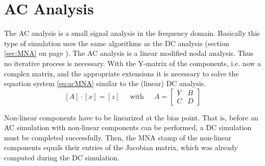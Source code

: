 %
%
%
%

\chapter{AC Analysis}
\label{sec:acMNA}

The AC analysis is a small signal analysis in the frequency domain.
Basically this type of simulation uses the same algorithms as the DC
analysis (section \ref{sec:MNA} on page \pageref{sec:MNA}).  The AC
analysis is a linear modified nodal analysis.  Thus no iterative
process is necessary.  With the Y-matrix of the components, i.e. now a
complex matrix, and the appropriate extensions it is necessary to
solve the equation system \eqref{eq:acMNA} similar to the (linear) DC
analysis.
\begin{equation}
\label{eq:acMNA}
\left[A\right] \cdot \left[x\right] = \left[z\right]
\;\;\;\; \textrm{ with } \;\;\;\;
A =
\begin{bmatrix}
Y & B\\
C & D
\end{bmatrix}
\end{equation}

Non-linear components have to be linearized at the bias point.
That is, before an AC simulation with non-linear components can
be performed, a DC simulation must be completed successfully.
Then, the MNA stamp of the non-linear components equals their
entries of the Jacobian matrix, which was already computed
during the DC simulation.
